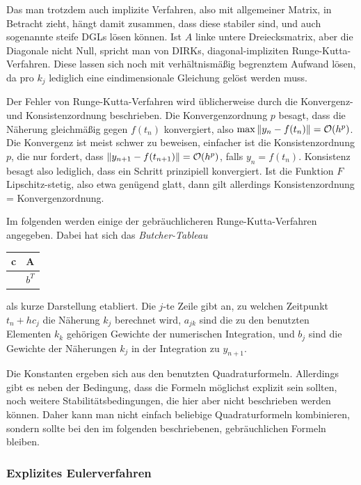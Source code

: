 Das man trotzdem auch implizite Verfahren, also mit allgemeiner
Matrix, in Betracht zieht, hängt damit zusammen, dass diese stabiler
sind, und auch sogenannte steife DGLs lösen können. Ist $A$ linke
untere Dreiecksmatrix, aber die Diagonale nicht Null, spricht man von
DIRKs, diagonal-impliziten Runge-Kutta-Verfahren. Diese lassen sich
noch mit verhältnismäßig begrenztem Aufwand lösen, da pro $k_j$
lediglich eine eindimensionale Gleichung gelöst werden muss.

Der Fehler von Runge-Kutta-Verfahren wird üblicherweise durch die
Konvergenz- und Konsistenzordnung beschrieben. Die Konvergenzordnung
$p$ besagt, dass die Näherung gleichmäßig gegen $f(t_n)$ konvergiert, also
$\max \left\lVert{y_n - f(t_n)}\right\rVert = \mathcal O(h^p)$. Die Konvergenz ist
meist schwer zu beweisen, einfacher ist die Konsistenzordnung $p$, die
nur fordert, dass $\left\lVert{y_{n+1} - f(t_{n+1})}\right\rVert = \mathcal O(h^p)$, falls
$y_n=f(t_n)$. Konsistenz besagt also lediglich, dass ein Schritt
prinzipiell konvergiert. Ist die Funktion $F$ Lipschitz-stetig, also
etwa genügend glatt, dann gilt allerdings Konsistenzordnung =
Konvergenzordnung.

%
Im folgenden werden einige der gebräuchlicheren Runge-Kutta-Verfahren
angegeben. Dabei hat sich das \emph{Butcher-Tableau}
\begin{center}
  \renewcommand{\arraystretch}{1.3}
  \begin{tabular}{r|l}
    c & A \\\hline
    & $b^T$
  \end{tabular}
\end{center}
als kurze Darstellung etabliert. Die $j$-te Zeile gibt an, zu welchen
Zeitpunkt $t_n + hc_j$ die Näherung $k_j$ berechnet wird, $a_{jk}$
sind die zu den benutzten Elementen $k_k$ gehörigen Gewichte der
numerischen Integration, und $b_j$ sind die Gewichte der
Näherungen $k_j$ in der Integration zu $y_{n+1}$.

Die Konstanten ergeben sich aus den benutzten
Quadraturformeln. Allerdings gibt es neben der Bedingung, dass die
Formeln möglichst explizit sein sollten, noch weitere
Stabilitätsbedingungen, die hier aber nicht beschrieben werden
können. Daher kann man nicht einfach beliebige Quadraturformeln
kombinieren, sondern sollte bei den im folgenden beschriebenen,
gebräuchlichen Formeln bleiben.

\subsubsection{Explizites Eulerverfahren}

